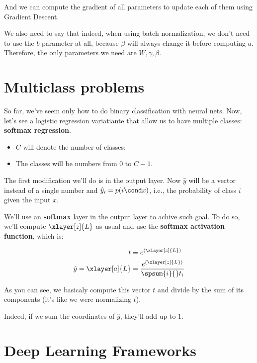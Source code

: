 \documentclass[12pt, a4paper, oneside]{book}
\begin{document}
And we can compute the gradient of all parameters to update each of them using
Gradient Descent.

\begin{obs}
    We also need to say that indeed, when using batch normalization, we don't
    need to use the $b$ parameter at all, because $\beta$ will always change it
    before computing $a$. Therefore, the only parameters we need are
    $W,\gamma,\beta$.
\end{obs}

\section{Multiclass problems}%
\label{sec:multiclass_problems}

So far, we've seem only how to do binary classification with neural nets. Now,
let's see a logistic regression variatiante that allow us to have multiple
classes: \textbf{softmax regression}.

\begin{nota}
\begin{itemize}
    \item $C$ will denote the number of classes;
    \item The classes will be numbers from $0$ to $C-1$.
\end{itemize}
\end{nota}

The first modification we'll do is in the output layer. Now $\hat{y}$ will be a
vector instead of a single number and $\hat{y}_i = p(i\cond x)$, i.e., the
probability of class $i$ given the input $x$.

We'll use an \textbf{softmax} layer in the output layer to achive such goal. To
do so, we'll compute $\xlayer[z]{L}$ as usual and use the \textbf{softmax
activation function}, which is:

\begin{align*}
    t &= e^{(\xlayer[z]{L})} \\
    \hat{y}=\xlayer[a]{L} &= \dfrac{e^{(\xlayer[z]{L})}}{\spsum{i}{}t_i}
\end{align*}

As you can see, we basicaly compute this vector $t$ and divide by the sum of its
components (it's like we were normalizing $t$).

Indeed, if we sum the coordinates of $\hat{y}$, they'll add up to $1$.

\section{Deep Learning Frameworks}%
\label{sec:deep_learning_frameworks}
\end{document}
